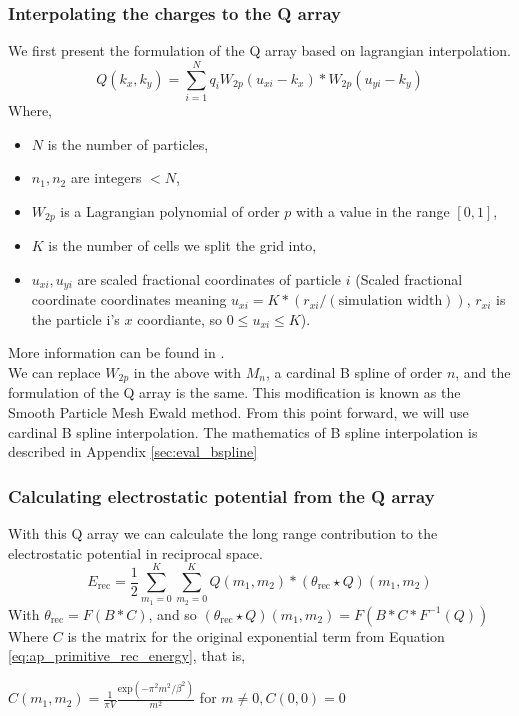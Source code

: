 \documentclass[pdftex,twoside,a4paper]{report}
\newcommand{\bcen}{\begin{center}}
\newcommand{\ecen}{\end{center}}
\newcommand{\pmem}{Particle Mesh Ewald method}
\begin{document}
\subsubsection{Interpolating the charges to the Q array}
\label{sec:math_desc_lagrange}
We first present the formulation of the Q array based on lagrangian interpolation. 
\begin{equation} \label{eq:q_array}
Q(k_x,k_y) = \sum_{i=1} ^N q_i W_{2p}(u_{xi} - k_x) * W_{2p}(u_{yi} - k_y)
\end{equation}
Where,
\begin{itemize}
    \item $N$ is the number of particles,
    \item $n_1,n_2$ are integers $< N$,
    \item $W_{2p}$ is a Lagrangian polynomial of order $p$ with a value in the range $[0,1]$,
    \item $K$ is the number of cells we split the grid into,
    \item $u_{xi}, u_{yi}$ are scaled fractional coordinates of particle $i$ (Scaled fractional coordinate coordinates meaning $u_{xi} = K * (r_{xi} / (\text{simulation width}))$, $r_{xi}$ is the particle i's $x$ coordiante, so $0 \leq u_{xi} \leq K$).
\end{itemize}
More information can be found in \cite{essmann:8577}.\\

We can replace $W_{2p}$ in the above with $M_n$, a cardinal B spline of order $n$, and the formulation of the Q array is the same. This modification is known as the Smooth \pmem{}. From this point forward, we will use cardinal B spline interpolation. The mathematics of B spline interpolation is described in Appendix \ref{sec:eval_bspline}


\subsubsection{Calculating electrostatic potential from the Q array}
With this Q array we can calculate the long range contribution to the electrostatic potential in reciprocal space.\\

\begin{equation}
E_{\text{rec}} = \frac{1}{2} \sum_{m_1 = 0}^K \sum_{m_2 = 0}^K Q(m_1,m_2) * (\theta_{\text{rec}} \star Q)(m_1,m_2)
\label{eq:energy_rec}
\end{equation}
With $\theta_{\text{rec}} = F(B * C)$, and so $(\theta_{\text{rec}} \star Q)(m_1,m_2) = F(B * C * F^{-1}(Q))$\\
Where $C$ is the matrix for the original exponential term from Equation \ref{eq:ap_primitive_rec_energy}, that is,
 \bcen
$\displaystyle
C(m_1,m_2) = \frac{1}{\pi V} \frac{\text{exp}(- \pi^2 m^2 / \beta^2)}{m^2} $ for $ m \not= 0, C(0,0) = 0$
\ecen
\end{document}
